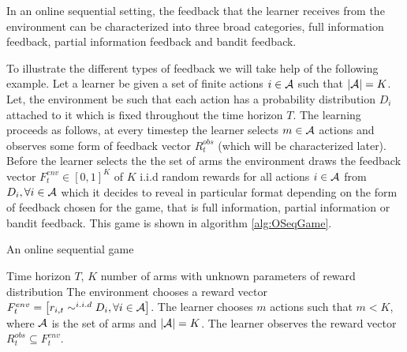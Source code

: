 In an online sequential setting, the feedback that the learner receives from the environment can be characterized into three broad categories, full information feedback, partial information feedback and bandit feedback. 


	To illustrate the different types of feedback we will take help of the following example. Let a learner be given a set of finite actions $i\in\mathcal{A}$ such that $|\mathcal{A}|=K$. Let, the environment be such that each action has a probability distribution $D_i$ attached to it which is fixed throughout the time horizon $T$. The learning proceeds as follows, at every timestep the learner selects $m\in\mathcal{A}$ actions and observes some form of feedback vector $R^{obs}_{t}$ (which will be characterized later). Before the learner selects the  the set of arms the environment draws the feedback vector $F^{env}_t\in[0,1]^{K}$ of $K$ i.i.d random rewards for all actions $i\in\mathcal{A}$ from $D_i,\forall i\in\mathcal{A}$ which it decides to reveal in particular format depending on the form of feedback chosen for the game, that is full information, partial information or bandit feedback. This game is shown in algorithm \ref{alg:OSeqGame}. 

\begin{algorithm}[!th]
\caption{An online sequential game}
\label{alg:OSeqGame}
\begin{algorithmic}
 Time horizon $T$, $K$ number of arms with unknown parameters of reward distribution
\State {}
\State The environment chooses a reward vector $F^{env}_{t}= \left[r_{i,t}\sim^{i.i.d} D_{i},\forall i\in\mathcal{A}\right]$.
\State The learner chooses $m$ actions such that $m < K$, where $\mathcal{A}$ is the set of arms and $|\mathcal{A}|=K$.
\State The learner observes the reward vector $R^{obs}_{t}\subseteq F^{env}_{t}$.
\State \EndFor
\end{algorithmic}
\end{algorithm}



